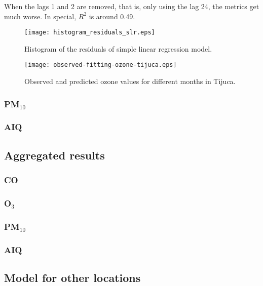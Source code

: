 When the lags 1 and 2 are removed, that is, only using the lag 24, the metrics
get much worse. In special, $R^2$ is around 0.49.  

\begin{figure}
    \centering
    \texttt{[image: histogram\_residuals\_slr.eps]}
    \caption{Histogram of the residuals of simple linear regression model.}
    \label{fig:histogram-residuals-slr}
\end{figure}

\begin{figure*}
    \centering
    \texttt{[image: observed-fitting-ozone-tijuca.eps]}
    \caption{Observed and predicted ozone values for different months in Tijuca.}
    \label{fig:observed-fitting-ozone-tijuca}
\end{figure*}

\subsubsection{PM\texorpdfstring{$_{10}$}{10}}

\subsubsection{AIQ}

\subsection{Aggregated results}

\subsubsection{CO}

\subsubsection{O\texorpdfstring{$_3$}{3}}

\subsubsection{PM\texorpdfstring{$_{10}$}{10}}

\subsubsection{AIQ}

\subsection{Model for other locations}

